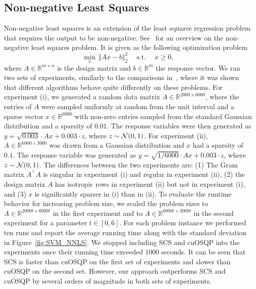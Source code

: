 \documentclass[letterpaper]{article} %
\DeclareMathOperator{\st}{s.t.}
\newcommand{\setR}{\mathbb{R}}
\newcommand{\norm}[1]{\left\Vert#1\right\Vert}
\begin{document}
\subsection{Non-negative Least Squares}
Non-negative least squares is an extension of the least squares regression problem that requires the output to be non-negative. See~\cite{Slawski13} for an overview on the non-negative least squares problem. It is given as the following optimization problem
\[
\min_{x}\, \norm{Ax-b}_2^2 \quad\st\quad x\geq 0,
\]
where $A\in\setR^{m\times n}$ is the design matrix and
$b\in\setR^m$ the response vector. We ran two sets of
experiments, similarly to the comparisons in~\cite{Slawski13}, where
it was shown that different algorithms behave quite differently on
these problems. For experiment (i), we generated a random data matrix
$A\in\setR^{2000\times 6000}$, where the entries of $A$ were sampled
uniformly at random from the unit interval and a sparse vector
$x\in\setR^{6000}$ with non-zero entries sampled from the standard Gaussian distribution and a sparsity of $0.01$. The response variables
were then generated as $y = \sqrt{0.003}\cdot Ax + 0.003 \cdot z$,
where $z\sim {\cal{N}}(0, 1)$. For experiment (ii),
$A\in\setR^{6000\times 3000}$ was drawn from a Gaussian distribution
and $x$ had a sparsity of $0.1$. The response variable was generated as
$y=\sqrt{1/6000}\cdot Ax+0.003\cdot z$, where $z\sim {\cal{N}}(0,
1)$. The differences between the two experiments are:
(1) The Gram matrix $A^\top A$ is singular in experiment (i) and
regular in experiment (ii), (2) the design matrix $A$ has isotropic
rows in experiment (ii) but not in experiment (i), and
(3) $x$ is significantly sparser in (i) than in (ii).
To evaluate the runtime behavior for increasing problem size, we scaled the problem sizes to $A\in\setR^{2000t \times 6000t}$ in the first experiment and to $A\in\setR^{6000t\times 3000t}$ in the second experiment for a parameter $t\in[0, 6]$. For each problem instance we performed ten runs and report the average running time along with the standard deviation in Figure~\ref{fig:SVM_NNLS}. We stopped including SCS and cuOSQP into the experiments once their running time exceeded $1000$ seconds. It can be seen that SCS is faster than cuOSQP on the first set of experiments and slower than cuOSQP on the second set. However, our approach outperforms SCS and cuOSQP by several orders of magnitude in both sets of experiments.
\end{document}
